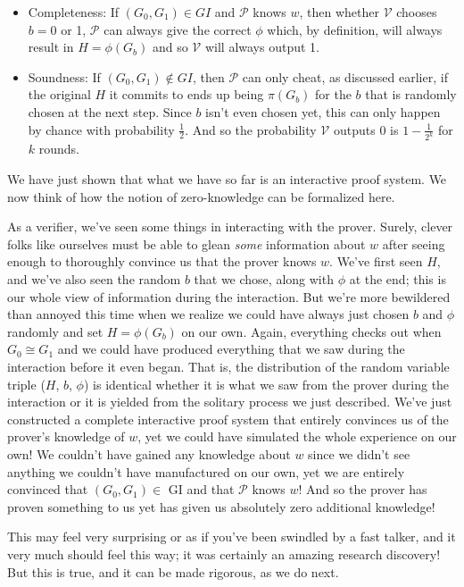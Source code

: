 		\begin{itemize}
			\item Completeness: If $(G_0,G_1)\in GI$ and $\mathcal{P}$ knows $w$, then whether $\mathcal{V}$ chooses $b=0$ or 1, $\mathcal{P}$ can always give the correct $\phi$ which, by definition, will always result in $H=\phi(G_b)$ and so $\mathcal{V}$ will always output 1.
			\item Soundness: If $(G_0,G_1)\notin GI$, then $\mathcal{P}$ can only cheat, as discussed earlier, if the original $H$ it commits to ends up being $\pi(G_b)$ for the $b$ that is randomly chosen at the next step.  Since $b$ isn't even chosen yet, this can only happen by chance with probability $\frac{1}{2}$.  And so the probability $\mathcal{V}$ outputs $0$ is $1-\frac{1}{2^k}$ for $k$ rounds.
		\end{itemize}
		
		We have just shown that what we have so far is an interactive proof system. We now think of how the notion of zero-knowledge can be formalized here.
		
		As a verifier, we've seen some things in interacting with the prover.  Surely, clever folks like ourselves must be able to glean \textit{some} information about $w$ after seeing enough to thoroughly convince us that the prover knows $w$.  We've first seen $H$, and we've also seen the random $b$ that we chose, along with $\phi$ at the end;  this is our whole view of information during the interaction.  But we're more bewildered than annoyed this time when we realize we could have always just chosen $b$ and $\phi$ randomly and set $H=\phi(G_b)$ on our own.  Again, everything checks out when $G_0 \cong G_1$ and we could have produced everything that we saw during the interaction before it even began.  That is, the distribution of the random variable triple ($H$, $b$, $\phi$) is identical whether it is what we saw from the prover during the interaction or it is yielded from the solitary process we just described.  We've just constructed a complete interactive proof system that entirely convinces us of the prover's knowledge of $w$, yet we could have simulated the whole experience on our own!  We couldn't have gained any knowledge about $w$ since we didn't see anything we couldn't have manufactured on our own, yet we are entirely convinced that $(G_0,G_1)\in$ GI and that $\mathcal{P}$ knows $w$!  And so the prover has proven something to us yet has given us absolutely zero additional knowledge!
		
		This may feel very surprising or as if you've been swindled by a fast talker, and it very much should feel this way; it was certainly an amazing research discovery!  But this is true, and it can be made rigorous, as we do next.
		
